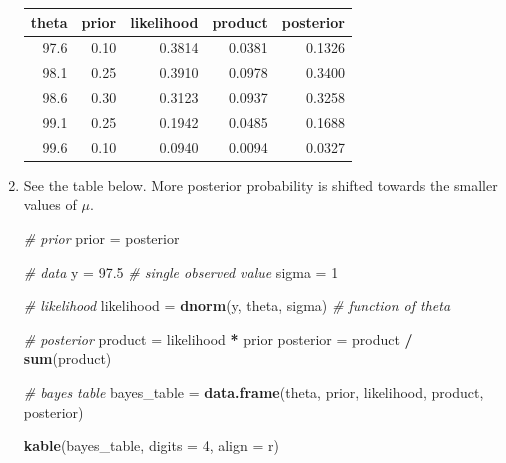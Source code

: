 \documentclass[
]{book}
\newenvironment{Shaded}{\begin{snugshade}}{\end{snugshade}}
\newcommand{\CommentTok}[1]{\textcolor[rgb]{0.56,0.35,0.01}{\textit{#1}}}
\newcommand{\DataTypeTok}[1]{\textcolor[rgb]{0.13,0.29,0.53}{#1}}
\newcommand{\DecValTok}[1]{\textcolor[rgb]{0.00,0.00,0.81}{#1}}
\newcommand{\FloatTok}[1]{\textcolor[rgb]{0.00,0.00,0.81}{#1}}
\newcommand{\KeywordTok}[1]{\textcolor[rgb]{0.13,0.29,0.53}{\textbf{#1}}}
\newcommand{\NormalTok}[1]{#1}
\newcommand{\OperatorTok}[1]{\textcolor[rgb]{0.81,0.36,0.00}{\textbf{#1}}}
\newcommand{\StringTok}[1]{\textcolor[rgb]{0.31,0.60,0.02}{#1}}
\theoremstyle{definition}
\theoremstyle{definition}
\theoremstyle{definition}
\theoremstyle{remark}
\begin{document}
\begin{enumerate}
  \begin{tabular}{r|r|r|r|r}
   \hline
   theta & prior & likelihood & product & posterior\\
   \hline
   97.6 & 0.10 & 0.3814 & 0.0381 & 0.1326\\
   \hline
   98.1 & 0.25 & 0.3910 & 0.0978 & 0.3400\\
   \hline
   98.6 & 0.30 & 0.3123 & 0.0937 & 0.3258\\
   \hline
   99.1 & 0.25 & 0.1942 & 0.0485 & 0.1688\\
   \hline
   99.6 & 0.10 & 0.0940 & 0.0094 & 0.0327\\
   \hline
   \end{tabular}
\item
  See the table below. More posterior probability is shifted towards the smaller values of \(\mu\).

\begin{Shaded}
\begin{Highlighting}[]
\CommentTok{\# prior}
\NormalTok{prior =}\StringTok{ }\NormalTok{posterior}

\CommentTok{\# data}
\NormalTok{y =}\StringTok{ }\FloatTok{97.5} \CommentTok{\# single observed value}
\NormalTok{sigma =}\StringTok{ }\DecValTok{1}


\CommentTok{\# likelihood}
\NormalTok{likelihood =}\StringTok{ }\KeywordTok{dnorm}\NormalTok{(y, theta, sigma) }\CommentTok{\# function of theta}

\CommentTok{\# posterior}
\NormalTok{product =}\StringTok{ }\NormalTok{likelihood }\OperatorTok{*}\StringTok{ }\NormalTok{prior}
\NormalTok{posterior =}\StringTok{ }\NormalTok{product }\OperatorTok{/}\StringTok{ }\KeywordTok{sum}\NormalTok{(product)}

\CommentTok{\# bayes table}
\NormalTok{bayes\_table =}\StringTok{ }\KeywordTok{data.frame}\NormalTok{(theta,}
\NormalTok{                     prior,}
\NormalTok{                     likelihood,}
\NormalTok{                     product,}
\NormalTok{                     posterior)}

\KeywordTok{kable}\NormalTok{(bayes\_table, }\DataTypeTok{digits =} \DecValTok{4}\NormalTok{, }\DataTypeTok{align =} \StringTok{\textquotesingle{}r\textquotesingle{}}\NormalTok{)}
\end{Highlighting}
\end{Shaded}


\end{enumerate}
\end{document}
